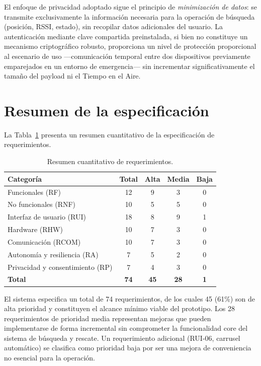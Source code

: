 El enfoque de privacidad adoptado sigue el principio de \textit{minimización de datos}: se transmite exclusivamente la información necesaria para la operación de búsqueda (posición, RSSI, estado), sin recopilar datos adicionales del usuario. La autenticación mediante clave compartida preinstalada, si bien no constituye un mecanismo criptográfico robusto, proporciona un nivel de protección proporcional al escenario de uso ---comunicación temporal entre dos dispositivos previamente emparejados en un entorno de emergencia--- sin incrementar significativamente el tamaño del payload ni el Tiempo en el Aire.


\section{Resumen de la especificación}\label{sec:resumen_req}

La Tabla~\ref{tab:resumen_req} presenta un resumen cuantitativo de la especificación de requerimientos.

\begin{table}[H]
\begin{center}
\caption{Resumen cuantitativo de requerimientos.}
\begin{tabular}{| l | c | c | c | c |}
\hline
\textbf{Categoría} & \textbf{Total} & \textbf{Alta} & \textbf{Media} & \textbf{Baja} \\
\hline\hline
Funcionales (RF) & 12 & 9 & 3 & 0 \\
\hline
No funcionales (RNF) & 10 & 5 & 5 & 0 \\
\hline
Interfaz de usuario (RUI) & 18 & 8 & 9 & 1 \\
\hline
Hardware (RHW) & 10 & 7 & 3 & 0 \\
\hline
Comunicación (RCOM) & 10 & 7 & 3 & 0 \\
\hline
Autonomía y resiliencia (RA) & 7 & 5 & 2 & 0 \\
\hline
Privacidad y consentimiento (RP) & 7 & 4 & 3 & 0 \\
\hline
\textbf{Total} & \textbf{74} & \textbf{45} & \textbf{28} & \textbf{1} \\
\hline
\end{tabular}
\label{tab:resumen_req}
\end{center}
\end{table}

El sistema especifica un total de 74 requerimientos, de los cuales 45 (61\%) son de alta prioridad y constituyen el alcance mínimo viable del prototipo. Los 28 requerimientos de prioridad media representan mejoras que pueden implementarse de forma incremental sin comprometer la funcionalidad core del sistema de búsqueda y rescate. Un requerimiento adicional (RUI-06, carrusel automático) se clasifica como prioridad baja por ser una mejora de conveniencia no esencial para la operación.